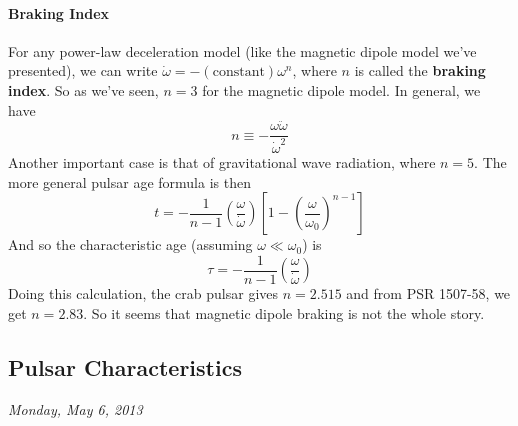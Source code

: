 \documentclass[10pt]{article}
\numberwithin{equation}{section}
\begin{document}
	\paragraph{Braking Index} %
	\label{par:braking_index}
	For any power-law deceleration model (like the magnetic dipole model we've presented), we can write $\dot{\omega} = - (\mathrm{constant})\omega^n$, where $n$ is called the \textbf{braking index}. So as we've seen, $n=3$ for the magnetic dipole model. In general, we have\\
	\begin{equation}
		\label{eq:spindown:11} n \equiv -\frac{\omega\ddot{\omega}}{\dot{\omega}^2}
	\end{equation}
	Another important case is that of gravitational wave radiation, where $n=5$. The more general pulsar age formula is then
	\begin{equation}
		\label{eq:spindown:12} t = -\frac{1}{n-1} \left(\frac{\omega}{\dot{\omega}}\right) \left[1-\left( \frac{\omega}{\omega_0}\right)^{n-1}\right]
	\end{equation}
	And so the characteristic age (assuming $\omega \ll \omega_0$) is 
	\begin{equation}
		\label{eq:spindown:13} \tau = -\frac{1}{n-1}\left(\frac{\omega}{\dot{\omega}}\right)
	\end{equation}
	Doing this calculation, the crab pulsar gives $n=2.515$ and from PSR 1507-58, we get $n=2.83$. So it seems that magnetic dipole braking is not the whole story.
	\subsection{Pulsar Characteristics} %
	\label{sub:pulsar_characteristics}
	\emph{Monday, May 6, 2013}\\
	
\end{document}
